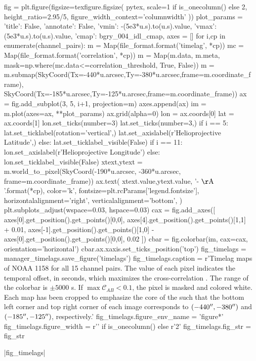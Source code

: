 \begin{pycode}
fig = plt.figure(figsize=texfigure.figsize(
    pytex,
    scale=1 if is_onecolumn() else 2,
    height_ratio=2.95/5,
    figure_width_context='columnwidth'
))
plot_params = {
    'title': False, 
    'annotate': False,
    'vmin': -(5e3*u.s).to(u.s).value,
    'vmax': (5e3*u.s).to(u.s).value,
    'cmap': bgry_004_idl_cmap,
}
axes = []
for i,cp in enumerate(channel_pairs):
    m = Map(file_format.format('timelag', *cp))
    mc = Map(file_format.format('correlation', *cp))
    m = Map(m.data, m.meta, mask=np.where(mc.data<=correlation_threshold, True, False))
    m = m.submap(SkyCoord(Tx=-440*u.arcsec,Ty=-380*u.arcsec,frame=m.coordinate_frame),
                 SkyCoord(Tx=-185*u.arcsec,Ty=-125*u.arcsec,frame=m.coordinate_frame))
    ax = fig.add_subplot(3, 5, i+1, projection=m)
    axes.append(ax)
    im = m.plot(axes=ax, **plot_params)
    ax.grid(alpha=0)
    lon = ax.coords[0]
    lat = ax.coords[1]
    lon.set_ticks(number=3)
    lat.set_ticks(number=3,) 
    if i == 5:
        lat.set_ticklabel(rotation='vertical',)
        lat.set_axislabel(r'Helioprojective Latitude',)
    else:
        lat.set_ticklabel_visible(False)
    if i == 11:
        lon.set_axislabel(r'Helioprojective Longitude')
    else:
        lon.set_ticklabel_visible(False)
    xtext,ytext = m.world_to_pixel(SkyCoord(-190*u.arcsec, -360*u.arcsec, frame=m.coordinate_frame))
    ax.text(
        xtext.value,ytext.value,
        '{}-{} $\mathrm{{\AA}}$'.format(*cp),
        color='k',
        fontsize=plt.rcParams['legend.fontsize'],
        horizontalalignment='right',
        verticalalignment='bottom',
    )
plt.subplots_adjust(wspace=0.03, hspace=0.03)
cax = fig.add_axes([
    axes[0].get_position().get_points()[0,0],
    axes[4].get_position().get_points()[1,1] + 0.01,
    axes[-1].get_position().get_points()[1,0] - axes[0].get_position().get_points()[0,0], 
    0.02
])
cbar = fig.colorbar(im, cax=cax, orientation='horizontal')
cbar.ax.xaxis.set_ticks_position('top')
fig_timelags = manager_timelags.save_figure('timelags')
fig_timelags.caption = r'Timelag maps of \AR{} NOAA 1158 for all 15 channel pairs. The value of each pixel indicates the temporal offset, in seconds, which maximizes the cross-correlation . The range of the colorbar is $\pm5000$ s. If $\max\mathcal{C}_{AB}<0.1$, the pixel is masked and colored white. Each map has been cropped to emphasize the core of the \AR{} such that the bottom left corner and top right corner of each image corresponds to $(-440\mbox{$^{\prime\prime}$},-380\mbox{$^{\prime\prime}$})$ and $(-185\mbox{$^{\prime\prime}$},-125\mbox{$^{\prime\prime}$})$, respectively.'
fig_timelags.figure_env_name = 'figure*'
fig_timelags.figure_width = r'\columnwidth' if is_onecolumn() else r'2\columnwidth'
fig_timelags.fig_str = fig_str
\end{pycode}
|fig_timelags|

